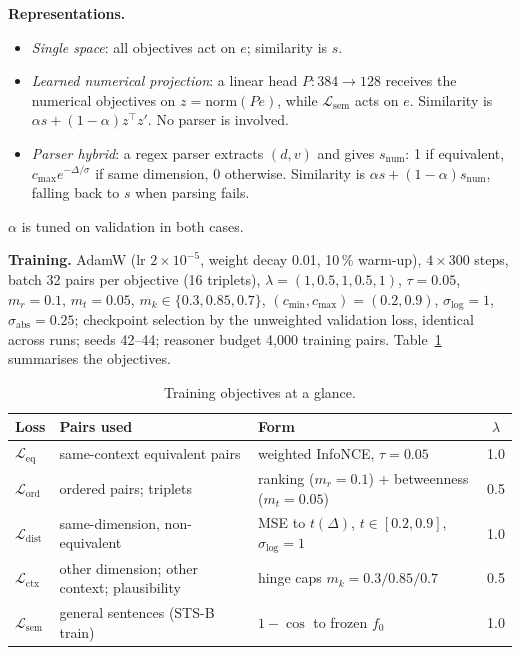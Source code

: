 \documentclass[conference]{IEEEtran}
\newcommand{\Lq}{\mathcal{L}}
\begin{document}
\textbf{Representations.}
\begin{itemize}[leftmargin=*,itemsep=1pt,topsep=2pt]
\item \emph{Single space}: all objectives act on $e$; similarity is $s$.
\item \emph{Learned numerical projection}: a linear head $P\!:\!384\!\to\!128$ receives the numerical objectives on
$z=\mathrm{norm}(Pe)$, while $\Lq_{\mathrm{sem}}$ acts on $e$. Similarity is $\alpha s+(1-\alpha)z^\top z'$. No parser is
involved.
\item \emph{Parser hybrid}: a regex parser extracts $(d,v)$ and gives $s_{\mathrm{num}}$: 1 if equivalent,
$c_{\max}e^{-\Delta/\sigma}$ if same dimension, 0 otherwise. Similarity is $\alpha s+(1-\alpha)s_{\mathrm{num}}$,
falling back to $s$ when parsing fails.
\end{itemize}
$\alpha$ is tuned on validation in both cases.

\textbf{Training.} AdamW (lr $2{\times}10^{-5}$, weight decay 0.01, 10\,\% warm-up), $4\times300$ steps, batch 32 pairs per
objective (16 triplets), $\lambda=(1,0.5,1,0.5,1)$, $\tau=0.05$, $m_r=0.1$, $m_t=0.05$, $m_k\in\{0.3,0.85,0.7\}$,
$(c_{\min},c_{\max})=(0.2,0.9)$, $\sigma_{\log}=1$, $\sigma_{\mathrm{abs}}=0.25$; checkpoint selection by the unweighted
validation loss, identical across runs; seeds 42--44; reasoner budget 4{,}000 training pairs. Table~\ref{tab:loss} summarises the objectives.

\begin{table}[t]
\centering\footnotesize\setlength{\tabcolsep}{3pt}
\caption{Training objectives at a glance.}
\label{tab:loss}
\begin{tabular}{@{}l>{\raggedright\arraybackslash}p{2.6cm}>{\raggedright\arraybackslash}p{3.3cm}c@{}}
\toprule
Loss & Pairs used & Form & $\lambda$ \\
\midrule
$\Lq_{\mathrm{eq}}$ & same-context equivalent pairs & weighted InfoNCE, $\tau=0.05$ & 1.0 \\
$\Lq_{\mathrm{ord}}$ & ordered pairs; triplets & ranking ($m_r=0.1$) + betweenness ($m_t=0.05$) & 0.5 \\
$\Lq_{\mathrm{dist}}$ & same-dimension, non-equivalent & MSE to $t(\Delta)$, $t\in[0.2,0.9]$, $\sigma_{\log}=1$ & 1.0 \\
$\Lq_{\mathrm{ctx}}$ & other dimension; other context; plausibility & hinge caps $m_k=0.3/0.85/0.7$ & 0.5 \\
$\Lq_{\mathrm{sem}}$ & general sentences (STS-B train) & $1-\cos$ to frozen $f_0$ & 1.0 \\
\bottomrule
\end{tabular}
\end{table}
\end{document}
